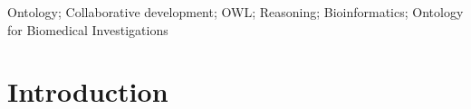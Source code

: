 \documentclass{elsart}       %
\begin{document}
\begin{frontmatter}
\begin{abstract}
\end{abstract}


\begin{keyword}
Ontology; Collaborative development; OWL; Reasoning; Bioinformatics; Ontology for Biomedical Investigations%
\end{keyword}
\end{frontmatter}


\section{Introduction}
\label{intro}
\end{document}
